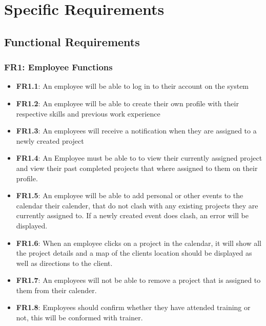 \documentclass[a4paper,12pt]{article}
\begin{document}
\section{Specific Requirements}
	\subsection{Functional Requirements}
		\subsubsection{FR1: Employee Functions}
			\begin{itemize}
				\item \textbf{FR1.1}: An employee will be able to log in to their account on the system
				\item \textbf{FR1.2}: An employee will be able to create their own profile with their        respective skills and previous work experience
				\item \textbf{FR1.3}: An employees will receive a notification when they are assigned to a    newly created project 
				
				\item \textbf{FR1.4}: An Employee must be able to to view their currently assigned           project and view their past completed projects that where assigned        to them on their profile. 
				
				\item \textbf{FR1.5}: An employee will be able to add personal or other events to the        calendar their calender, that do not clash with any existing               projects they are currently assigned to. If a newly created event        does clash, an error will be displayed.  
				
				\item \textbf{FR1.6}: When an employee clicks on a project in the calendar, it will show     all the project details and a map of the clients location should be       displayed as well as directions to the client.
				
				\item \textbf{FR1.7}: An employees will not be able to remove a project that is assigned     to them from their calender.
				
				\item \textbf{FR1.8}: Employees should confirm whether they have attended training or not, this will be conformed with trainer.
			\end{itemize}
	
\end{document}
